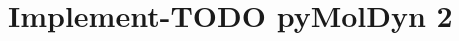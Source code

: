 \documentclass[a4paper,12pt]{scrartcl}
\begin{document}
\section*{Implement-TODO pyMolDyn 2}

\end{document}
